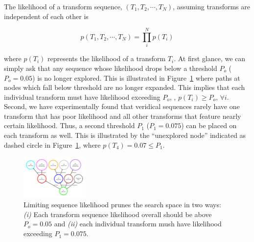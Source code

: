 

The likelihood of a transform sequence, $(T_1,T_2,\cdots,T_N)$, assuming transforms are independent of each other is 

\begin{equation}
p(T_1,T_2,\cdots,T_N)=\prod_i^Np(T_i)
\label{eq:path_like}
\end{equation}

\noindent
where $p(T_i)$ represents the likelihood of a transform $T_i$. At first glance, we can simply ask that any sequence whose likelihood drops below a threshold $P_o$ ($P_o=0.05$) is no longer explored. This is illustrated in Figure~\ref{fig:cgraph_limit} where paths at nodes which fall below threshold are no longer expanded. This implies that each individual transform must have likelihood exceeding $P_o$, \ie, $p(T_i) \geq P_o$, $\forall i$. Second, we have experimentally found that veridical sequences rarely have one transform that has poor likelihood and all other transforms that feature nearly certain likelihood. Thus, a second threshold $P_1$ ($P_1=0.075$) can be placed on each transform as well. This is illustrated by the ``unexplored node'' indicated as dashed circle in Figure~\ref{fig:cgraph_limit}, where $p(T_4)=0.07 \le P_1$. 

\begin{figure}[ht]
  \centering
\includegraphics[width=0.30\textwidth]{figs/cgraph_cost.pdf}

  \caption{Limiting sequence likelihood prunes the search space in two ways: \emph{(i)} Each transform sequence likelihood overall should be above $P_o=0.05$ and \emph{(ii)} each individual transform mush have likelihood exceeding $P_1=0.075$.}
  \label{fig:cgraph_limit}
\end{figure}

